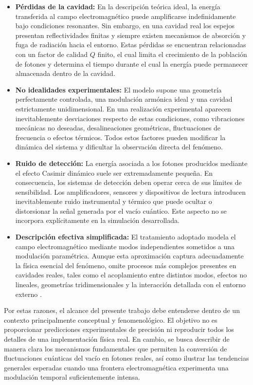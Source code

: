 \documentclass[11pt,a4paper]{article}
\begin{document}
\begin{itemize}

\item \textbf{Pérdidas de la cavidad:} En la descripción teórica ideal, la energía transferida al campo electromagnético puede amplificarse indefinidamente bajo condiciones resonantes. Sin embargo, en una cavidad real los espejos presentan reflectividades finitas y siempre existen mecanismos de absorción y fuga de radiación hacia el entorno. Estas pérdidas se encuentran relacionadas con un factor de calidad $Q$ finito, el cual limita el crecimiento de la población de fotones y determina el tiempo durante el cual la energía puede permanecer almacenada dentro de la cavidad.

\item \textbf{No idealidades experimentales:} El modelo supone una geometría perfectamente controlada, una modulación armónica ideal y una cavidad estrictamente unidimensional. En una realización experimental aparecen inevitablemente desviaciones respecto de estas condiciones, como vibraciones mecánicas no deseadas, desalineaciones geométricas, fluctuaciones de frecuencia o efectos térmicos. Todos estos factores pueden modificar la dinámica del sistema y dificultar la observación directa del fenómeno.

\item \textbf{Ruido de detección:} La energía asociada a los fotones producidos mediante el efecto Casimir dinámico suele ser extremadamente pequeña. En consecuencia, los sistemas de detección deben operar cerca de sus límites de sensibilidad. Los amplificadores, sensores y dispositivos de lectura introducen inevitablemente ruido instrumental y térmico que puede ocultar o distorsionar la señal generada por el vacío cuántico. Este aspecto no se incorpora explícitamente en la simulación desarrollada.

\item \textbf{Descripción efectiva simplificada:} El tratamiento adoptado modela el campo electromagnético mediante modos independientes sometidos a una modulación paramétrica. Aunque esta aproximación captura adecuadamente la física esencial del fenómeno, omite procesos más complejos presentes en cavidades reales, tales como el acoplamiento entre distintos modos, efectos no lineales, geometrías tridimensionales y la interacción detallada con el entorno externo \cite{dodonov2020}.

\end{itemize}

Por estas razones, el alcance del presente trabajo debe entenderse dentro de un contexto principalmente conceptual y fenomenológico. El objetivo no es proporcionar predicciones experimentales de precisión ni reproducir todos los detalles de una implementación física real. En cambio, se busca describir de manera clara los mecanismos fundamentales que permiten la conversión de fluctuaciones cuánticas del vacío en fotones reales, así como ilustrar las tendencias generales esperadas cuando una frontera electromagnética experimenta una modulación temporal suficientemente intensa.
\end{document}
